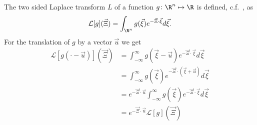 
The two sided Laplace transform $L$ of a function $g\colon \R^n \mapsto \R$ is defined, c.f.~\cite{weissteinLaplace}, as
\begin{equation}
  \label{eq: Definition of Laplace}
  \mathcal{L}[g](\vec{\Xi}) = \int_{\R^n} g(\vec{\xi}) e^{-\vec{\Xi} \cdot \vec{\xi}}d\vec{\xi}.
\end{equation}
For the translation of $g$ by a vector $\vec{u}$ we get
\begin{equation}
  \label{eq: translated laplace}
  \begin{aligned}
    \mathcal{L}[g(\cdot - \vec{u})](\vec{\Xi})
    & = \int_{-\infty}^\infty g(\vec{\xi}-\vec{u}) e^{-\vec{\Xi} \cdot \vec{\xi}}d\vec{\xi} \\
    & = \int_{-\infty}^\infty g(\vec{\xi}) e^{-\vec{\Xi} \cdot (\vec{\xi}+\vec{u})}d\vec{\xi} \\
    & =  e^{-\vec{\Xi} \cdot \vec{u}} \int_{-\infty}^\infty g(\vec{\xi}) e^{-\vec{\Xi} \cdot \vec{\xi}}d\vec{\xi} \\
    & =  e^{-\vec{\Xi} \cdot \vec{u}} \mathcal{L}[g](\vec{\Xi})
  \end{aligned}
\end{equation}
